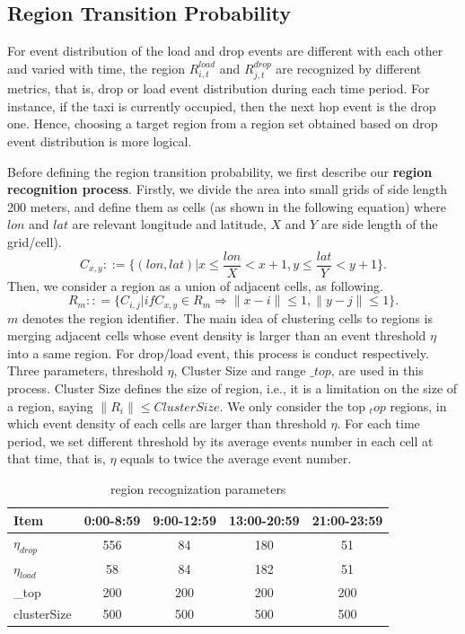 \subsection{Region Transition Probability}
For event distribution of the load and drop events are different with each other and varied with time, the region $R_{i,t}^{load}$ and $R_{j,t}^{drop}$ are recognized by different metrics, that is, drop or load event distribution during  each time period. For instance, if the taxi is currently occupied, then the next hop event is the drop one. Hence, choosing a target region from a region set obtained based on drop event distribution is more logical. 

Before defining the region transition probability, we first describe our \textbf{region recognition process}.
Firstly, we divide the area into small grids of side length 200 meters, and define them as cells (as shown in the following equation) where $lon$ and $lat$ are relevant longitude and latitude, $X$ and $Y$ are side length of the grid/cell).
\[C_{x,y}::=\{(lon,lat)|x \le \frac{{lon}}{{X}} < x + 1,
y \le \frac{{lat}}{{Y}} < y + 1\}.\]
Then, we consider a region as a union of adjacent cells, as following.
\[R_m:: = \{ C_{i,j}|if C_{x,y} \in R_m
\Rightarrow \|x - i\| \le 1,\|y - j\| \le 1\}.\]
$m$ denotes the region identifier.
The main idea of clustering cells to regions is merging adjacent cells whose event density is larger than an event threshold $\eta$ into a same region.
For drop/load event, this process is conduct respectively. 
Three parameters, threshold $\eta$, Cluster Size and range $\_top$, are used in this process. 
Cluster Size defines the size of region, i.e., it is a limitation on the size of a region, saying $\|R_i\|\leq ClusterSize$.
We only consider the top $_top$ regions, in which event density of each cells are larger than threshold $\eta$.
For each time period,  we set different threshold by its average events number in each cell at that time, that is, $\eta$ equals to twice the average event number.

\begin{table}
\caption{region recognization parameters}
\centering
\begin{tabular}{l|c|c|c|c}
  \hline
  Item & 0:00-8:59 &9:00-12:59&13:00-20:59 &21:00-23:59 \\
  \hline
  $\eta_{drop}$ & 556&84 &180 &51\\
  $\eta_{load}$ & 58&84 &182 &51\\
  \_top & 200&200 &200 &200\\
  clusterSize& 500&500 &500 &500\\
  \hline
\end{tabular}
\end{table}

